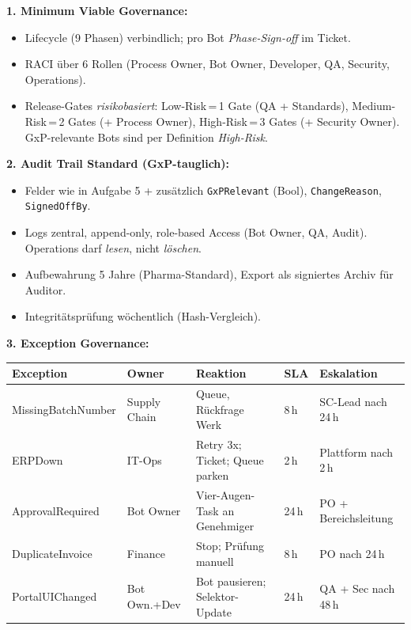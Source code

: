 \documentclass[11pt,a4paper,oneside]{article}
\begin{document}
\begin{loesungbox}
\textbf{1. Minimum Viable Governance:}
\begin{itemize}
  \item Lifecycle (9 Phasen) verbindlich; pro Bot \emph{Phase-Sign-off} im Ticket.
  \item RACI \"uber 6 Rollen (Process Owner, Bot Owner, Developer, QA, Security, Operations).
  \item Release-Gates \emph{risikobasiert}: Low-Risk\,=\,1 Gate (QA + Standards), Medium-Risk\,=\,2 Gates (+ Process Owner), High-Risk\,=\,3 Gates (+ Security Owner). GxP-relevante Bots sind per Definition \emph{High-Risk}.
\end{itemize}

\smallskip
\textbf{2. Audit Trail Standard (GxP-tauglich):}
\begin{itemize}
  \item Felder wie in Aufgabe 5 + zus\"atzlich \texttt{GxPRelevant} (Bool), \texttt{ChangeReason}, \texttt{SignedOffBy}.
  \item Logs zentral, append-only, role-based Access (Bot Owner, QA, Audit). Operations darf \emph{lesen}, nicht \emph{l\"oschen}.
  \item Aufbewahrung 5 Jahre (Pharma-Standard), Export als signiertes Archiv f\"ur Auditor.
  \item Integrit\"atspr\"ufung w\"ochentlich (Hash-Vergleich).
\end{itemize}

\smallskip
\textbf{3. Exception Governance:}

\smallskip
\begin{tabularx}{\linewidth}{@{}p{3.0cm}p{2.4cm}Xp{1.4cm}p{2.4cm}@{}}
\toprule
\textbf{Exception} & \textbf{Owner} & \textbf{Reaktion} & \textbf{SLA} & \textbf{Eskalation} \\
\midrule
MissingBatchNumber  & Supply Chain & Queue, R\"uckfrage Werk             & 8\,h  & SC-Lead nach 24\,h \\
ERPDown             & IT-Ops       & Retry 3x; Ticket; Queue parken      & 2\,h  & Plattform nach 2\,h \\
ApprovalRequired    & Bot Owner    & Vier-Augen-Task an Genehmiger       & 24\,h & PO + Bereichsleitung \\
DuplicateInvoice    & Finance      & Stop; Pr\"ufung manuell             & 8\,h  & PO nach 24\,h \\
PortalUIChanged     & Bot Own.+Dev & Bot pausieren; Selektor-Update      & 24\,h & QA + Sec nach 48\,h \\
\bottomrule
\end{tabularx}


\end{loesungbox}
\end{document}
